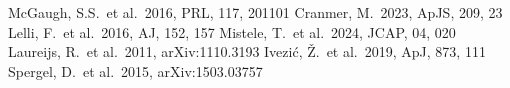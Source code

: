 \documentclass[twocolumn]{aastex631}
\begin{document}
\begin{thebibliography}{}
 McGaugh, S.S.\ et al.\ 2016, PRL, 117, 201101
 Cranmer, M.\ 2023, ApJS, 209, 23
 Lelli, F.\ et al.\ 2016, AJ, 152, 157
 Mistele, T.\ et al.\ 2024, JCAP, 04, 020
 Laureijs, R.\ et al.\ 2011, arXiv:1110.3193
 Ivezi\'c, \v{Z}.\ et al.\ 2019, ApJ, 873, 111
 Spergel, D.\ et al.\ 2015, arXiv:1503.03757
\end{thebibliography}
\end{document}
